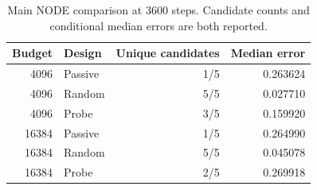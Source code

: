 \begin{table}[tb]
\centering\small
\caption{Main NODE comparison at 3600 steps. Candidate counts and conditional median errors are both reported.}\label{tab:main}
\begin{tabular}{rlrr}\toprule
Budget & Design & Unique candidates & Median error \\
\midrule
4096 & Passive & 1/5 & 0.263624 \\
4096 & Random & 5/5 & 0.027710 \\
4096 & Probe & 3/5 & 0.159920 \\
16384 & Passive & 1/5 & 0.264990 \\
16384 & Random & 5/5 & 0.045078 \\
16384 & Probe & 2/5 & 0.269918 \\
\bottomrule\end{tabular}
\end{table}
